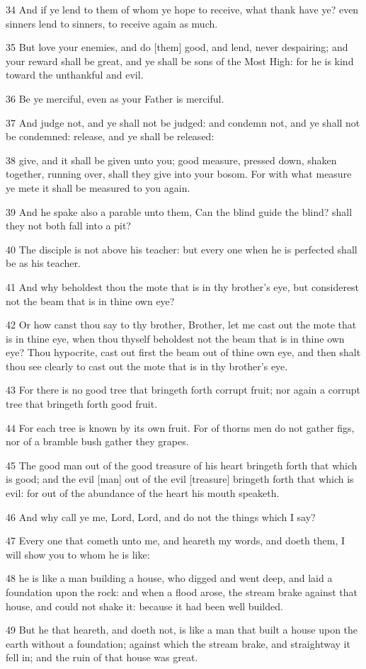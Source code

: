 \par 34 And if ye lend to them of whom ye hope to receive, what thank have ye? even sinners lend to sinners, to receive again as much.
\par 35 But love your enemies, and do [them] good, and lend, never despairing; and your reward shall be great, and ye shall be sons of the Most High: for he is kind toward the unthankful and evil.
\par 36 Be ye merciful, even as your Father is merciful.
\par 37 And judge not, and ye shall not be judged: and condemn not, and ye shall not be condemned: release, and ye shall be released:
\par 38 give, and it shall be given unto you; good measure, pressed down, shaken together, running over, shall they give into your bosom. For with what measure ye mete it shall be measured to you again.
\par 39 And he spake also a parable unto them, Can the blind guide the blind? shall they not both fall into a pit?
\par 40 The disciple is not above his teacher: but every one when he is perfected shall be as his teacher.
\par 41 And why beholdest thou the mote that is in thy brother's eye, but considerest not the beam that is in thine own eye?
\par 42 Or how canst thou say to thy brother, Brother, let me cast out the mote that is in thine eye, when thou thyself beholdest not the beam that is in thine own eye? Thou hypocrite, cast out first the beam out of thine own eye, and then shalt thou see clearly to cast out the mote that is in thy brother's eye.
\par 43 For there is no good tree that bringeth forth corrupt fruit; nor again a corrupt tree that bringeth forth good fruit.
\par 44 For each tree is known by its own fruit. For of thorns men do not gather figs, nor of a bramble bush gather they grapes.
\par 45 The good man out of the good treasure of his heart bringeth forth that which is good; and the evil [man] out of the evil [treasure] bringeth forth that which is evil: for out of the abundance of the heart his mouth speaketh.
\par 46 And why call ye me, Lord, Lord, and do not the things which I say?
\par 47 Every one that cometh unto me, and heareth my words, and doeth them, I will show you to whom he is like:
\par 48 he is like a man building a house, who digged and went deep, and laid a foundation upon the rock: and when a flood arose, the stream brake against that house, and could not shake it: because it had been well builded.
\par 49 But he that heareth, and doeth not, is like a man that built a house upon the earth without a foundation; against which the stream brake, and straightway it fell in; and the ruin of that house was great.

